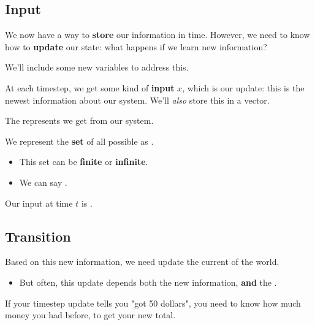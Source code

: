         \pagebreak

    \subsection{Input}

        We now have a way to \textbf{store} our information in time. However, we need to know how to \textbf{update} our state: what happens if we learn new information? 

        We'll include some new variables to address this.

        \subsecdiv

        At each timestep, we get some kind of \textbf{input} $x$, which is our update: this is the newest information about our system. We'll \textit{also} store this in a vector.\\
        
        \begin{definition}
            The   represents  we get from our system.
            
            We represent the \textbf{set} of all possible  as .
                \begin{itemize}
                    \item This set can be \textbf{finite} or \textbf{infinite}.
                    \item We can say .
                \end{itemize}
                
            Our input at time $t$ is .
        \end{definition}

    \subsection{Transition}

        Based on this new information, we need update the current  of the world.

        \begin{itemize}
            \item But often, this update depends both the new information, \textbf{and} the .
        \end{itemize}

        \miniex If your timestep update tells you "got 50 dollars", you need to know how much money you had before, to get your new total.

